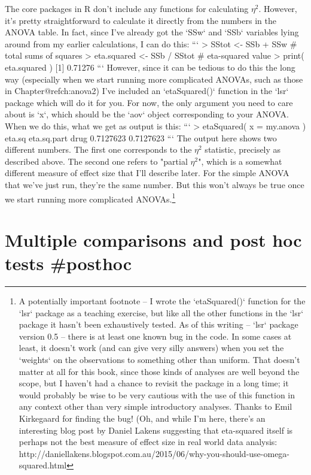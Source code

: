 The core packages in R don't include any functions for calculating $\eta^2$. However, it's pretty straightforward to calculate it directly from the numbers in the ANOVA table. In fact, since I've already got the `SSw` and `SSb` variables lying around from my earlier calculations, I can do this:
```
> SStot <- SSb + SSw          # total sums of squares
> eta.squared <- SSb / SStot  # eta-squared value
> print( eta.squared )
[1] 0.71276
```
However, since it can be tedious to do this the long way (especially when we start running more complicated ANOVAs, such as those in Chapter@refch:anova2) I've included an `etaSquared()` function in the `lsr` package which will do it for you. For now, the only argument you need to care about is `x`, which should be the `aov` object corresponding to your ANOVA. When we do this, what we get as output is this:
```
> etaSquared( x = my.anova )
        eta.sq eta.sq.part
drug 0.7127623   0.7127623
```
The output here shows two different numbers. The first one corresponds to the $\eta^2$ statistic, precisely as described above. The second one refers to "partial $\eta^2$", which is a somewhat different measure of effect size that I'll describe later. For the simple ANOVA that we've just run, they're the same number. But this won't always be true once we start running more complicated ANOVAs.\footnote{A potentially important footnote -- I wrote the `etaSquared()` function for the `lsr` package as a teaching exercise, but like all the other functions in the `lsr` package it hasn't been exhaustively tested. As of this writing -- `lsr` package version 0.5 -- there is at least one known bug in the code. In some cases at least, it doesn't work (and can give very silly answers) when you set the `weights` on the observations to something other than uniform. That doesn't matter at all for this book, since those kinds of analyses are well beyond the scope, but I haven't had a chance to revisit the package in a long time; it would probably be wise to be very cautious with the use of this function in any context other than very simple introductory analyses. Thanks to Emil Kirkegaard for finding the bug! (Oh, and while I'm here, there's an interesting blog post by Daniel Lakens suggesting that eta-squared itself is perhaps not the best measure of effect size in real world data analysis: http://daniellakens.blogspot.com.au/2015/06/why-you-should-use-omega-squared.html}




\section{Multiple comparisons and post hoc tests {#posthoc}}

